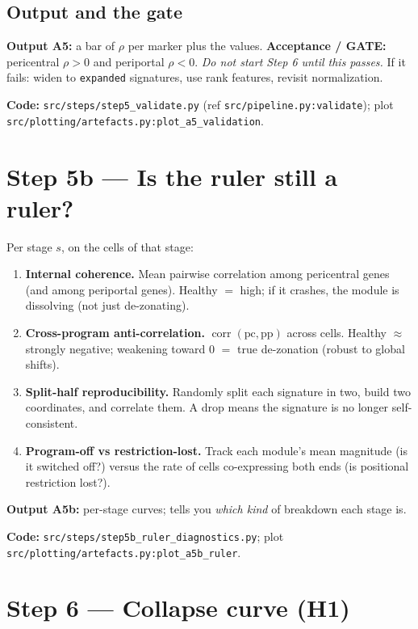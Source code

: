 \documentclass[11pt]{article}
\newcommand{\code}[1]{\texttt{\small #1}}
\begin{document}
\subsection{Output and the gate}
\textbf{Output A5:} a bar of $\rho$ per marker plus the values. \textbf{Acceptance / GATE:}
pericentral $\rho>0$ and periportal $\rho<0$. \emph{Do not start Step 6 until this passes.} If it
fails: widen to \code{expanded} signatures, use rank features, revisit normalization.

\medskip
\noindent\textbf{Code:} \code{src/steps/step5\_validate.py} (ref \code{src/pipeline.py:validate});
plot \code{src/plotting/artefacts.py:plot\_a5\_validation}.

\section{Step 5b --- Is the ruler still a ruler?}

Per stage $s$, on the cells of that stage:
\begin{enumerate}[leftmargin=1.6em]
  \item \textbf{Internal coherence.} Mean pairwise correlation among pericentral genes (and among
        periportal genes). Healthy $=$ high; if it crashes, the module is dissolving (not just
        de-zonating).
  \item \textbf{Cross-program anti-correlation.} $\operatorname{corr}(\text{pc}, \text{pp})$
        across cells. Healthy $\approx$ strongly negative; weakening toward $0$ $=$ true
        de-zonation (robust to global shifts).
  \item \textbf{Split-half reproducibility.} Randomly split each signature in two, build two
        coordinates, and correlate them. A drop means the signature is no longer self-consistent.
  \item \textbf{Program-off vs restriction-lost.} Track each module's mean magnitude (is it
        switched off?) versus the rate of cells co-expressing both ends (is positional restriction
        lost?).
\end{enumerate}

\textbf{Output A5b:} per-stage curves; tells you \emph{which kind} of breakdown each stage is.

\medskip
\noindent\textbf{Code:} \code{src/steps/step5b\_ruler\_diagnostics.py};
plot \code{src/plotting/artefacts.py:plot\_a5b\_ruler}.

\section{Step 6 --- Collapse curve (H1)}
\end{document}
